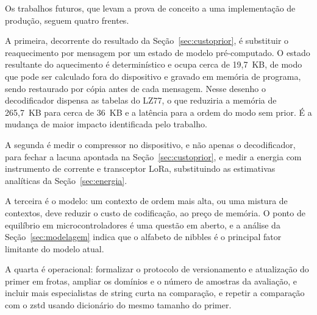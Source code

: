 \documentclass[12pt]{article}
\begin{document}
Os trabalhos futuros, que levam a prova de conceito a uma implementação de
produção, seguem quatro frentes.

A primeira, decorrente do resultado da Seção~\ref{sec:custoprior}, é substituir
o reaquecimento por mensagem por um estado de modelo pré-computado. O estado
resultante do aquecimento é determinístico e ocupa cerca de 19,7~KB, de modo que
pode ser calculado fora do dispositivo e gravado em memória de programa, sendo
restaurado por cópia antes de cada mensagem. Nesse desenho o decodificador
dispensa as tabelas do LZ77, o que reduziria a memória de 265,7~KB para cerca de
36~KB e a latência para a ordem do modo sem prior. É a mudança de maior impacto
identificada pelo trabalho.

A segunda é medir o compressor no dispositivo, e não apenas o decodificador,
para fechar a lacuna apontada na Seção~\ref{sec:custoprior}, e medir a energia
com instrumento de corrente e transceptor LoRa, substituindo as estimativas
analíticas da Seção~\ref{sec:energia}.

A terceira é o modelo: um contexto de ordem mais alta, ou uma mistura de
contextos, deve reduzir o custo de codificação, ao preço de memória. O ponto de
equilíbrio em microcontroladores é uma questão em aberto, e a análise da
Seção~\ref{sec:modelagem} indica que o alfabeto de nibbles é o principal fator
limitante do modelo atual.

A quarta é operacional: formalizar o protocolo de versionamento e atualização do
primer em frotas, ampliar os domínios e o número de amostras da avaliação, e
incluir mais especialistas de string curta na comparação, e repetir a comparação
com o zstd usando dicionário do mesmo tamanho do primer.



\end{document}
